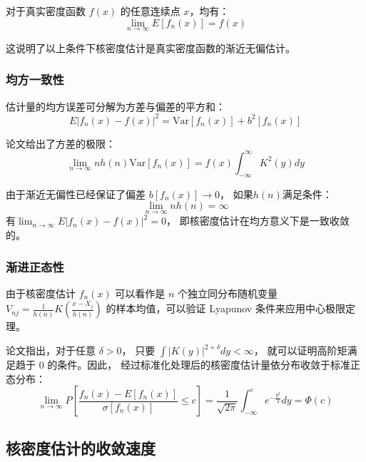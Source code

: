 \documentclass[UTF8]{ctexart}
\begin{document}
对于真实密度函数 $f(x)$ 的任意连续点 $x$，均有：
\begin{equation}
\lim_{n \rightarrow \infty} E[f_n(x)] = f(x)
\end{equation}

这说明了以上条件下核密度估计是真实密度函数的渐近无偏估计。

\subsubsection{均方一致性}

估计量的均方误差可分解为方差与偏差的平方和：
\begin{equation}
E|f_n(x) - f(x)|^2 = \text{Var}[f_n(x)] + b^2[f_n(x)]
\end{equation}

论文给出了方差的极限：
\begin{equation}
\lim_{n \rightarrow \infty} n h(n) \text{Var}[f_n(x)] = f(x) \int_{-\infty}^{\infty} K^2(y) dy
\end{equation}

由于渐近无偏性已经保证了偏差 $b[f_n(x)] \rightarrow 0$，
如果$h(n)$满足条件：
\begin{equation}
\lim_{n \rightarrow \infty} n h(n) = \infty
\end{equation}
有$\lim_{n \rightarrow \infty} E|f_n(x) - f(x)|^2 = 0$，
即核密度估计在均方意义下是一致收敛的。

\subsubsection{渐进正态性}

由于核密度估计 $f_n(x)$ 可以看作是 $n$ 个独立同分布随机变量 $V_{nj} = \frac{1}{h(n)} K\left(\frac{x - X_j}{h(n)}\right)$ 
的样本均值，可以验证 Lyapunov 条件来应用中心极限定理。

论文指出，对于任意 $\delta > 0$，
只要 $\int |K(y)|^{2+\delta} dy < \infty$，
就可以证明高阶矩满足趋于 $0$ 的条件。因此，
经过标准化处理后的核密度估计量依分布收敛于标准正态分布：
\begin{equation}
\lim_{n \rightarrow \infty} P\left[ \frac{f_n(x) - E[f_n(x)]}{\sigma[f_n(x)]} \le c \right] = \frac{1}{\sqrt{2\pi}} \int_{-\infty}^{c} e^{-\frac{y^2}{2}} dy = \Phi(c)
\end{equation}



\subsection{核密度估计的收敛速度}
\end{document}
